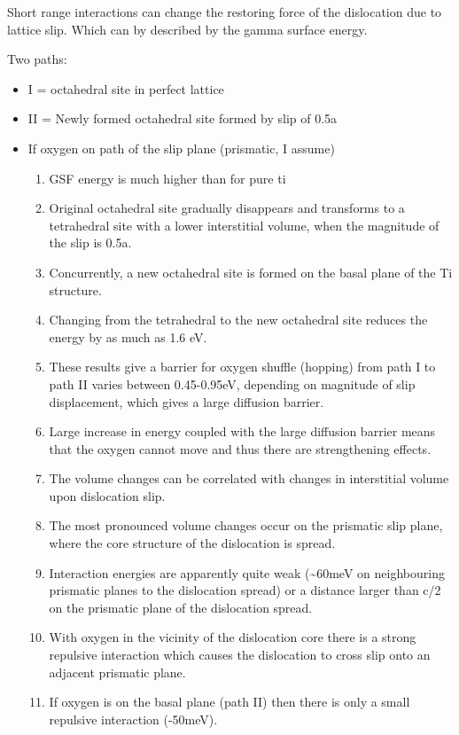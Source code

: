\documentclass[a4paper,12pt,oneside,print,numbered,index,PageStyleIII]{PhDThesisPSnPDF}
\begin{document}
Short range interactions can change the restoring force of the
dislocation due to lattice slip. Which can by described by the
gamma surface energy. 

Two paths: 
\begin{itemize}
\item I  = octahedral site in perfect lattice
\item II = Newly formed octahedral site formed by slip of 0.5a

\item If oxygen on path of the slip plane (prismatic, I assume)
\begin{enumerate}
\item GSF energy is much higher than for pure ti
\item Original octahedral site gradually disappears and transforms
to a tetrahedral site with a lower interstitial volume, when
the magnitude of the slip is 0.5a.
\item Concurrently, a new octahedral site is formed on the basal
plane of the Ti structure.
\item Changing from the tetrahedral to the new octahedral site
reduces the energy by as much as 1.6 eV.
\item These results give a barrier for oxygen shuffle (hopping) from
path I to path II varies between 0.45-0.95eV, depending on
magnitude of slip displacement, which gives a large diffusion
barrier.
\item Large increase in energy coupled with the large diffusion
barrier means that the oxygen cannot move and thus there are
strengthening effects.
\item The volume changes can be correlated with changes in
interstitial volume upon dislocation slip.
\item The most pronounced volume changes occur on the prismatic slip
plane, where the core structure of the dislocation is spread.
\item Interaction energies are apparently quite weak (\textasciitilde{}60meV on neighbouring
prismatic planes to the dislocation spread) or a distance
larger than c/2 on the prismatic plane of the dislocation
spread.
\item With oxygen in the vicinity of the dislocation core there is
a strong repulsive interaction which causes the dislocation
to cross slip onto an adjacent prismatic plane.
\item If oxygen is on the basal plane (path II) then there is only
a small repulsive interaction (-50meV).
\end{enumerate}
\end{itemize}
\end{document}

